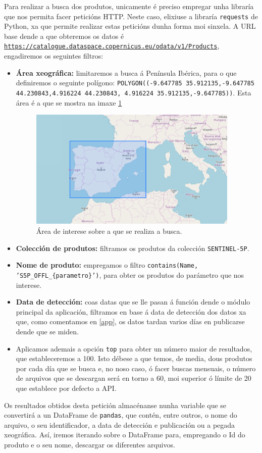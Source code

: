 Para realizar a busca dos produtos, unicamente é preciso empregar unha libraría que nos permita facer peticións HTTP. Neste caso, elixiuse a libraría \texttt{requests} de Python, xa que permite
realizar estas peticións dunha forma moi sinxela. A URL base dende a que obteremos os datos é \texttt{\url{https://catalogue.dataspace.copernicus.eu/odata/v1/Products}}, engadiremos os seguintes
filtros:
\begin{itemize}
    \item \textbf{Área xeográfica:} limitaremos a busca á Península Ibérica, para o que definiremos o seguinte polígono: \texttt{POLYGON((-9.647785 35.912135,-9.647785 44.230843,4.916224 44.230843,
        4.916224 35.912135,-9.647785))}.
    Esta área é a que se mostra na imaxe \ref{fig:areainterese}
    \begin{figure}
        \centerline{\includegraphics[width=10cm]{figuras/area.png}}
        \caption{Área de interese sobre a que se realiza a busca.}
        \label{fig:areainterese}
    \end{figure}
    \item \textbf{Colección de produtos:} filtramos os produtos da colección \texttt{SENTINEL-5P}.
    \item \textbf{Nome de produto:} empregamos o filtro \texttt{contains(Name, 'S5P\_OFFL\_\{parametro\}')}, para obter os produtos do parámetro que nos interese.
    \item \textbf{Data de detección:} coas datas que se lle pasan á función dende o módulo principal da aplicación, filtramos en base á data de detección dos datos xa que, como comentamos en \ref{app}, os
    datos tardan varios días en publicarse dende que se miden.
    \item Aplicamos ademais a opción \texttt{top} para obter un número maior de resultados, que estableceremos a 100. Isto débese a que temos, de media, dous produtos por cada día que se busca e,
    no noso caso, ó facer buscas mensuais, o número de arquivos que se descargan será en torno a 60, moi superior ó límite de 20 que establece por defecto a API.
\end{itemize}
Os resultados obtidos desta petición almacénanse nunha variable que se convertirá a un DataFrame de \texttt{pandas}, que contén, entre outros, o nome do arquivo, o seu identificador, a data de
detección e publicación ou a pegada xeográfica. Así, iremos iterando sobre o DataFrame para, empregando o Id do produto e o seu nome, descargar os diferentes arquivos.

